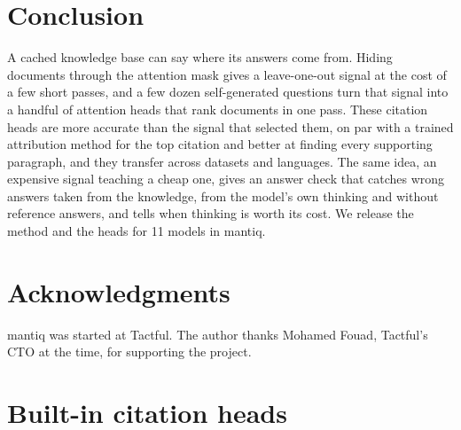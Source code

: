\documentclass[11pt]{article}
\begin{document}
\section{Conclusion}
\label{sec:conclusion}

A cached knowledge base can say where its answers come from. Hiding documents through the attention mask gives a leave-one-out signal at the cost of a few short passes, and a few dozen self-generated questions turn that signal into a handful of attention heads that rank documents in one pass. These citation heads are more accurate than the signal that selected them, on par with a trained attribution method for the top citation and better at finding every supporting paragraph, and they transfer across datasets and languages. The same idea, an expensive signal teaching a cheap one, gives an answer check that catches wrong answers taken from the knowledge, from the model's own thinking and without reference answers, and tells when thinking is worth its cost. We release the method and the heads for 11 models in mantiq.

\section*{Acknowledgments}

mantiq was started at Tactful. The author thanks Mohamed Fouad, Tactful's CTO at the time, for supporting the project.




\appendix

\section{Built-in citation heads}
\label{app:heads}
\end{document}
